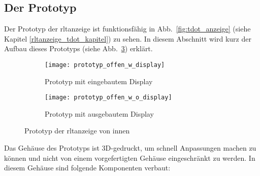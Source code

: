  \subsection{Der Prototyp}
Der Prototyp der \ac{rltanzeige} ist funktionsfähig in Abb.~\ref{fig:tdot_anzeige} (siehe Kapitel \ref{rltanzeige_tdot_kapitel}) zu sehen. In diesem Abschnitt wird kurz der Aufbau dieses Prototyps (siehe Abb.~\ref{fig:rlt_anzeige_prototyp}) erklärt. 

\begin{figure}[H]
    \begin{subfigure}[l]{0.48\textwidth}
        \centering
        \texttt{[image: prototyp\_offen\_w\_display]}
        \caption{Prototyp mit eingebautem Display \label{fig:prototyp_w_display}}
    \end{subfigure}
    \hfill
    \begin{subfigure}[r]{0.504\textwidth}
        \centering
        \texttt{[image: prototyp\_offen\_w\_o\_display]}
        \caption{Prototyp mit ausgebautem Display \label{fig:prototyp_w_o_display}}
    \end{subfigure}
	\caption{Prototyp der \ac{rltanzeige} von innen \label{fig:rlt_anzeige_prototyp}}
\end{figure}

Das Gehäuse des Prototyps ist 3D-gedruckt, um schnell Anpassungen machen zu können und nicht von einem vorgefertigten Gehäuse eingeschränkt zu werden. In diesem Gehäuse sind folgende Komponenten verbaut:

